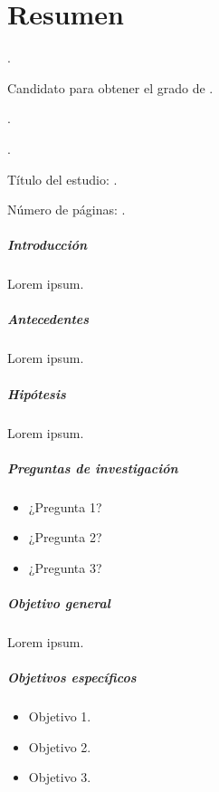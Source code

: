 
\chapter{Resumen}

{\renewcommand{\baselinestretch}{1.1}\selectfont
{\setlength{\leftskip}{10mm}
\setlength{\parindent}{-10mm}

\autor.

Candidato para obtener el grado de \grado\orientacion.

\uanl.

\fime.

Título del estudio: \textsc{\titulo}.

\noindent Número de páginas: \pageref*{lastpage}.}

\paragraph{Introducción}
Lorem ipsum.

\paragraph{Antecedentes}
Lorem ipsum.

\paragraph{Hipótesis}
Lorem ipsum.

\paragraph{Preguntas de investigación}
\begin{itemize}
    \item ¿Pregunta 1?
    \item ¿Pregunta 2?
    \item ¿Pregunta 3?
\end{itemize}

\paragraph{Objetivo general}
Lorem ipsum.

\paragraph{Objetivos específicos}
\begin{itemize}
    \item Objetivo 1.
    \item Objetivo 2.
    \item Objetivo 3.
\end{itemize}

}
